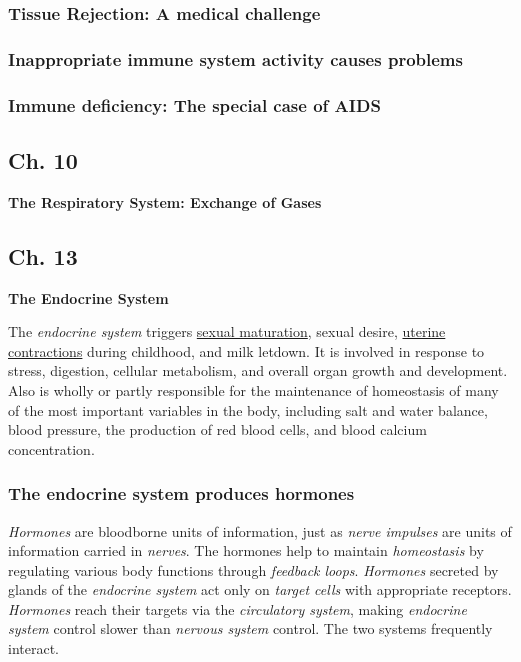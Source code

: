 \documentclass[11pt]{article}
\begin{document}
\subsubsection{Tissue Rejection: A medical challenge}
\label{sec:orgb2a5382}

\subsubsection{Inappropriate immune system activity causes problems}
\label{sec:org6b195f0}

\subsubsection{Immune deficiency: The special case of AIDS}
\label{sec:orgfc2524c}

\subsection{Ch. 10}
\label{sec:orgc20807d}
\textbf{The Respiratory System: Exchange of Gases}
\subsection{Ch. 13}
\label{sec:org8eaba64}
\textbf{The Endocrine System}

The \emph{endocrine system} triggers \uline{sexual maturation}, sexual desire, \uline{uterine
contractions} during childhood, and milk letdown. It is involved in response to
stress, digestion, cellular metabolism, and overall organ growth and
development. Also is wholly or partly responsible for the maintenance of
homeostasis of many of the most important variables in the body, including salt
and water balance, blood pressure, the production of red blood cells, and blood
calcium concentration.

\subsubsection{The endocrine system produces hormones}
\label{sec:org3feb5e7}
\emph{Hormones} are bloodborne units of information, just as \emph{nerve impulses} are units
of information carried in \emph{nerves}. The hormones help to maintain \emph{homeostasis} by
regulating various body functions through \emph{feedback loops}. \emph{Hormones} secreted by
glands of the \emph{endocrine system} act only on \emph{target cells} with appropriate
receptors. \emph{Hormones} reach their targets via the \emph{circulatory system}, making
\emph{endocrine system} control slower than \emph{nervous system} control. The two systems
frequently interact.
\end{document}
